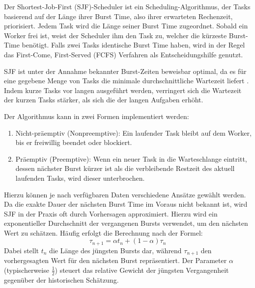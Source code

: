 \begin{sloppypar}
\noindent Der Shortest-Job-First (\acs{SJF})-Scheduler ist ein Scheduling-Algorithmus, der Tasks basierend auf der Länge ihrer Burst Time, also ihrer erwarteten Rechenzeit, priorisiert. Jedem Task wird die Länge seiner Burst Time zugeordnet. Sobald ein Worker frei ist, weist der Scheduler ihm den Task zu, welcher die kürzeste Burst-Time benötigt.
Falls zwei Tasks identische Burst Time haben, wird in der Regel das First-Come, First-Served (\acs{FCFS}) Verfahren als Entscheidungshilfe genutzt.

\vspace{7.56mm}

\noindent \acs{SJF} ist unter der Annahme bekannter Burst-Zeiten beweisbar optimal, da es für eine gegebene Menge von Tasks die minimale durchschnittliche Wartezeit liefert \cite{Silberschatz:2018}.
Indem kurze Tasks vor langen ausgeführt werden, verringert sich die Wartezeit der kurzen Tasks stärker, als sich die der langen Aufgaben erhöht.

\vspace{7.56mm}

\noindent Der Algorithmus kann in zwei Formen implementiert werden:
 \begin{enumerate}
    \item Nicht-präemptiv (Nonpreemptive): Ein laufender Task bleibt auf dem Worker, bis er freiwillig beendet oder blockiert.
    \item Präemptiv (Preemptive): Wenn ein neuer Task in die Warteschlange eintritt,
    dessen nächster Burst kürzer ist als die verbleibende Restzeit des aktuell laufenden Tasks, wird dieser unterbrochen.
 \end{enumerate}
 
\vspace{7.56mm}

\noindent Hierzu können je nach verfügbaren Daten verschiedene Ansätze gewählt werden.
Da die exakte Dauer der nächsten Burst Time im Voraus nicht bekannt ist, 
wird \acs{SJF} in der Praxis oft durch Vorhersagen approximiert. Hierzu wird ein exponentieller Durchschnitt der vergangenen Bursts verwendet,
um den nächsten Wert zu schätzen.
Häufig erfolgt die Berechnung nach der Formel:
\begin{equation}
    \tau_{n+1} = \alpha t_n + (1 - \alpha)\tau_n
\end{equation}
\noindent Dabei stellt $t_n$ die Länge des jüngsten Bursts dar, während $\tau_{n+1}$ den vorhergesagten Wert für den nächsten Burst repräsentiert. 
Der Parameter $\alpha$ (typischerweise $\frac{1}{2}$) steuert das relative Gewicht der jüngsten Vergangenheit gegenüber der historischen Schätzung.




\end{sloppypar}
